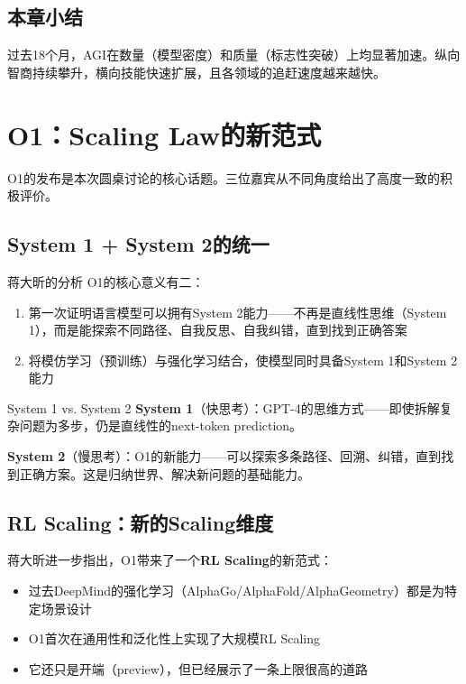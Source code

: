 \documentclass[a4paper]{article}
\begin{document}
\subsection{本章小结}

过去18个月，AGI在数量（模型密度）和质量（标志性突破）上均显著加速。纵向智商持续攀升，横向技能快速扩展，且各领域的追赶速度越来越快。


\section{O1：Scaling Law的新范式}

O1的发布是本次圆桌讨论的核心话题。三位嘉宾从不同角度给出了高度一致的积极评价。

\subsection{System 1 + System 2的统一}

\begin{importantbox}{蒋大昕的分析}
O1的核心意义有二：
\begin{enumerate}
\item 第一次证明语言模型可以拥有System 2能力——不再是直线性思维（System 1），而是能探索不同路径、自我反思、自我纠错，直到找到正确答案
\item 将模仿学习（预训练）与强化学习结合，使模型同时具备System 1和System 2能力
\end{enumerate}
\end{importantbox}

\begin{knowledgebox}{System 1 vs. System 2}
\textbf{System 1}（快思考）：GPT-4的思维方式——即使拆解复杂问题为多步，仍是直线性的next-token prediction。

\textbf{System 2}（慢思考）：O1的新能力——可以探索多条路径、回溯、纠错，直到找到正确方案。这是归纳世界、解决新问题的基础能力。
\end{knowledgebox}

\subsection{RL Scaling：新的Scaling维度}

蒋大昕进一步指出，O1带来了一个\textbf{RL Scaling}的新范式：

\begin{itemize}
\item 过去DeepMind的强化学习（AlphaGo/AlphaFold/AlphaGeometry）都是为特定场景设计
\item O1首次在通用性和泛化性上实现了大规模RL Scaling
\item 它还只是开端（preview），但已经展示了一条上限很高的道路
\end{itemize}
\end{document}
